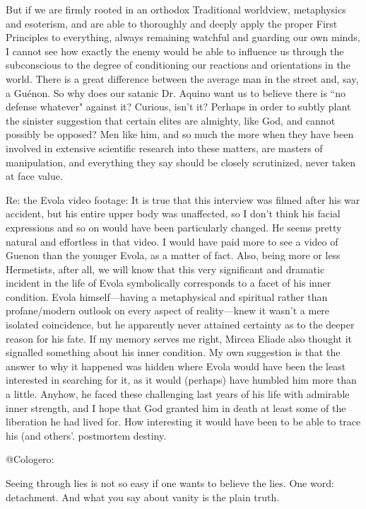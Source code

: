 \begin{footnotesize}
\begin{sffamily}
But if we are firmly rooted in an orthodox Traditional worldview, metaphysics and esoterism, and are able to thoroughly and deeply apply the proper First Principles to everything, always remaining watchful and guarding our own minds, I cannot see how exactly the enemy would be able to influence us through the subconscious to the degree of conditioning our reactions and orientations in the world. There is a great difference between the average man in the street and, say, a Guénon. So why does our satanic Dr. Aquino want us to believe there is ``no defense whatever" against it? Curious, isn't it? Perhaps in order to subtly plant the sinister suggestion that certain elites are almighty, like God, and cannot possibly be opposed? Men like him, and so much the more when they have been involved in extensive scientific research into these matters, are masters of manipulation, and everything they say should be closely scrutinized, never taken at face value.

Re: the Evola video footage: It is true that this interview was filmed after his war accident, but his entire upper body was unaffected, so I don't think his facial expressions and so on would have been particularly changed. He seems pretty natural and effortless in that video. I would have paid more to see a video of Guenon than the younger Evola, as a matter of fact. Also, being more or less Hermetists, after all, we will know that this very significant and dramatic incident in the life of Evola symbolically corresponds to a facet of his inner condition. Evola himself—having a metaphysical and spiritual rather than profane/modern outlook on every aspect of reality—knew it wasn't a mere isolated coincidence, but he apparently never attained certainty as to the deeper reason for his fate. If my memory serves me right, Mircea Eliade also thought it signalled something about his inner condition. My own suggestion is that the answer to why it happened was hidden where Evola would have been the least interested in searching for it, as it would (perhaps) have humbled him more than a little. Anyhow, he faced these challenging last years of his life with admirable inner strength, and I hope that God granted him in death at least some of the liberation he had lived for. How interesting it would have been to be able to trace his (and others'. postmortem destiny.

@Cologero:

Seeing through lies is not so easy if one wants to believe the lies. One word: detachment. And what you say about vanity is the plain truth.


\end{sffamily}
\end{footnotesize}
